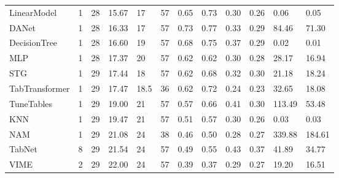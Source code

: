 \begin{tabular}{lllllrllllll}
LinearModel & 1 & 28 & 15.67 & 17 & 57 & 0.65 & 0.73 & 0.30 & 0.26 & 0.06 & 0.05 \\
DANet & 1 & 28 & 16.33 & 17 & 57 & 0.73 & 0.77 & 0.33 & 0.29 & 84.46 & 71.30 \\
DecisionTree & 1 & 28 & 16.60 & 19 & 57 & 0.68 & 0.75 & 0.37 & 0.29 & 0.02 & 0.01 \\
MLP & 1 & 28 & 17.37 & 20 & 57 & 0.62 & 0.62 & 0.30 & 0.28 & 28.17 & 16.94 \\
STG & 1 & 29 & 17.44 & 18 & 57 & 0.62 & 0.68 & 0.32 & 0.30 & 21.18 & 18.24 \\
TabTransformer & 1 & 29 & 17.47 & 18.5 & 36 & 0.62 & 0.72 & 0.24 & 0.23 & 32.65 & 18.08 \\
TuneTables & 1 & 29 & 19.00 & 21 & 57 & 0.57 & 0.66 & 0.41 & 0.30 & 113.49 & 53.48 \\
KNN & 1 & 29 & 19.47 & 21 & 57 & 0.51 & 0.57 & 0.30 & 0.26 & 0.03 & 0.03 \\
NAM & 1 & 29 & 21.08 & 24 & 38 & 0.46 & 0.50 & 0.28 & 0.27 & 339.88 & 184.61 \\
TabNet & 8 & 29 & 21.54 & 24 & 57 & 0.49 & 0.55 & 0.43 & 0.37 & 41.89 & 34.77 \\
VIME & 2 & 29 & 22.00 & 24 & 57 & 0.39 & 0.37 & 0.29 & 0.27 & 19.20 & 16.51 \\
\bottomrule
\end{tabular}
